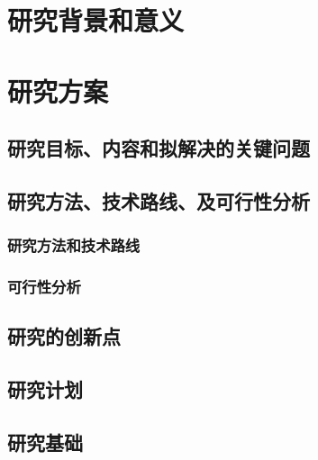 {
    \chapter{研究背景和意义}
    

    
    
    \chapter{研究方案}
    \section{研究目标、内容和拟解决的关键问题}
    
    \section{研究方法、技术路线、及可行性分析}
    \subsection{研究方法和技术路线}
    
    \subsection{可行性分析}
    
    \section{研究的创新点}
    
    \section{研究计划}
    

    \section{研究基础}
    
}
{
    
    
    
    
    
    
}



